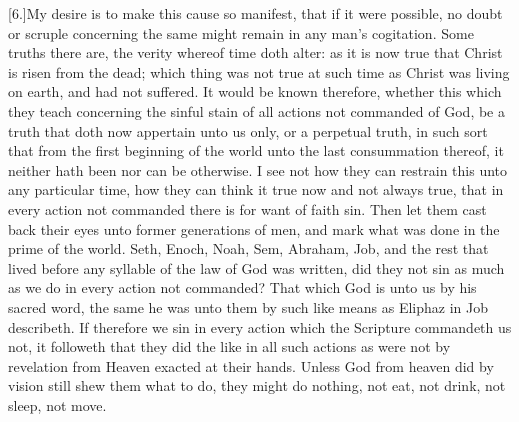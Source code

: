 [6.]My desire is to make this cause so manifest, that if it were possible, no doubt or scruple concerning the same might remain in any man’s cogitation. Some truths there are, the verity whereof time doth alter: as it is now true that Christ is risen from the dead; which thing was not true at such time as Christ was living on earth, and had not suffered. It would be known therefore, whether this which they teach concerning the sinful stain of all actions not commanded of God, be a truth that doth now appertain unto us only, or a perpetual truth, in such sort that from the first beginning of the world unto the last consummation thereof, it neither hath been nor can be otherwise. I see not how they can restrain this unto any particular time, how they can think it true now and not always true, that in every action not commanded there is for want of faith sin. Then let them cast back their eyes unto former generations of men, and mark what was done in the prime of the world. Seth, Enoch, Noah, Sem, Abraham, Job, and the rest that lived before any syllable of the law of God was written, did they not sin as much as we do in every action not commanded? That which God is unto us by his sacred word, the same he was unto them by such like means as Eliphaz in Job describeth. If therefore we sin in every action which the Scripture commandeth us not, it followeth that they did the like in all such actions as were not by revelation from Heaven exacted at their hands. Unless God from heaven did by vision still shew them what to do, they might do nothing, not eat, not drink, not sleep, not move.

